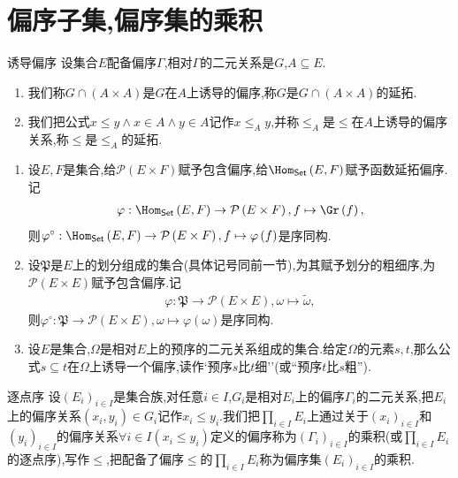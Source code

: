 \section{偏序子集,偏序集的乘积}

\begin{definition}{诱导偏序}{}
	设集合$E$配备偏序$\Gamma$,相对$\Gamma$的二元关系是$G$,$A\subseteq E$.
	\begin{enumerate}
		\item 我们称$G\cap\left(A\times A\right)$是$G$在$A$上诱导的偏序,称$G$是$G\cap\left(A\times A\right)$的延拓.
		\item 我们把公式$x\leq y\wedge x\in A\wedge y\in A$记作$x\leq_{A}y$,并称$\leq_{A}$是$\leq$在$A$上诱导的偏序关系,称$\leq$是$\leq_{A}$的延拓.
	\end{enumerate}
\end{definition}

\begin{example}{}{}
	\begin{enumerate}
		\item 设$E,F$是集合,给$\mathcal{P}\left(E\times F\right)$赋予包含偏序,给$\Hom_{\mathsf{Set}}\left(E,F\right)$赋予函数延拓偏序.记
		\begin{align*}
			\varphi:\Hom_{\mathsf{Set}}\left(E,F\right)\to\mathcal{P}\left(E\times F\right),f\mapsto\Gr\left(f\right),
		\end{align*}
		则$\varphi^{\circ}:\Hom_{\mathsf{Set}}\left(E,F\right)\to\mathcal{P}\left(E\times F\right),f\mapsto\varphi\left(f\right)$是序同构.
		\item 设$\mathfrak{P}$是$E$上的划分组成的集合(具体记号同前一节),为其赋予划分的粗细序,为$\mathcal{P}\left(E\times E\right)$赋予包含偏序.记
		\begin{align*}
			\varphi:\mathfrak{P}\to\mathcal{P}\left(E\times E\right),\omega\mapsto\tilde{\omega},
		\end{align*}
		则$\varphi^{\circ}:\mathfrak{P}\to\mathcal{P}\left(E\times E\right),\omega\mapsto\varphi\left(\omega\right)$是序同构.
		\item 设$E$是集合,$\Omega$是相对$E$上的预序的二元关系组成的集合.给定$\Omega$的元素$s,t$,那么公式$s\subseteq t$在$\Omega$上诱导一个偏序,读作`预序$s$比$t$细''(或``预序$t$比$s$粗'').
	\end{enumerate}
\end{example}

\begin{definition}{逐点序}{}
	设$\left(E_{i}\right)_{i\in I}$是集合族,对任意$i\in I$,$G_{i}$是相对$E_{i}$上的偏序$\Gamma_{i}$的二元关系,把$E_{i}$上的偏序关系$\left(x_{i},y_{i}\right)\in G_{i}$记作$x_{i}\leq y_{i}$.我们把$\prod\limits_{i\in I}E_{i}$上通过关于$\left(x_{i}\right)_{i\in I}$和$\left(y_{i}\right)_{i\in I}$的偏序关系$\forall i\in I\left(x_{i}\leq y_{i}\right)$定义的偏序称为$\left(\Gamma_{i}\right)_{i\in I}$的乘积(或$\prod\limits_{i\in I}E_{i}$的逐点序),写作$\leq$,把配备了偏序$\leq$的$\prod\limits_{i\in I}E_{i}$称为偏序集$\left(E_{i}\right)_{i\in I}$的乘积.
\end{definition}


